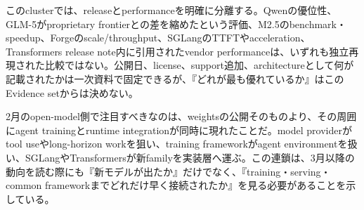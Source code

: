 \begin{claimboundary}
このclusterでは、releaseとperformanceを明確に分離する。Qwenの優位性、GLM-5がproprietary frontierとの差を縮めたという評価、M2.5のbenchmark・speedup、Forgeのscale/throughput、SGLangのTTFTやacceleration、Transformers release note内に引用されたvendor performanceは、いずれも独立再現された比較ではない。公開日、license、support追加、architectureとして何が記載されたかは一次資料で固定できるが、『どれが最も優れているか』はこのEvidence setからは決めない。\autocite{src-5bc0746a47c6,src-9156c37fb1c2,src-a43d64987293,src-d8e13386974c,src-eac8dfbeb78c}
\end{claimboundary}

2月のopen-model側で注目すべきなのは、weightsの公開そのものより、その周囲にagent trainingとruntime integrationが同時に現れたことだ。model providerがtool useやlong-horizon workを狙い、training frameworkがagent environmentを扱い、SGLangやTransformersが新familyを実装層へ運ぶ。この連鎖は、3月以降の動向を読む際にも『新モデルが出たか』だけでなく、『training・serving・common frameworkまでどれだけ早く接続されたか』を見る必要があることを示している。\autocite{src-5bc0746a47c6,src-a43d64987293,src-d8e13386974c}
